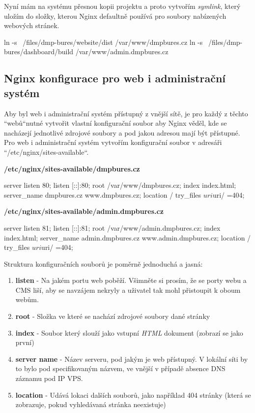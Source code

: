 \documentclass[12pt,a4paper]{report}
\begin{document}
  Nyní mám na systému přesnou kopii projektu a proto vytvořím \emph{symlink}, který uložím do složky,
  kterou Nginx defaultně používá pro soubory nabízených webových stránek.

  \begin{bash}
    ln -s ~/files/dmp-bures/website/dist /var/www/dmpbures.cz
    ln -s ~/files/dmp-bures/dashboard/build /var/www/admin.dmpbures.cz
  \end{bash}

  \subsection{Nginx konfigurace pro web i administrační systém}
  Aby byl web i administrační systém přístupný z vnější sítě, je pro každý z těchto ``webů``\space nutné  vytvořit 
  vlastní konfigurační soubor aby Nginx věděl, kde se nacházejí jednotlivé zdrojové soubory a 
  pod jakou adresou mají být přístupné.
  Pro web i administrační systém vytvořím konfigurační soubor v adresáři ``/etc/nginx/sites-available``.
  
  \noindent\textbf{/etc/nginx/sites-available/dmpbures.cz}
  \begin{bash}
  server {
    listen 80;
    listen [::]:80;
    root /var/www/dmpbures.cz;
    index index.html;
    server_name dmpbures.cz www.dmpbures.cz;
    location / {
      try_files $uri $uri/ =404;
    }
  }
  \end{bash}

  \noindent\textbf{/etc/nginx/sites-available/admin.dmpbures.cz}
  \begin{bash}
  server {
    listen 81;
    listen [::]:81;
    root /var/www/admin.dmpbures.cz;
    index index.html;
    server_name admin.dmpbures.cz www.admin.dmpbures.cz;
    location / {
      try_files $uri $uri/ =404;
    }
  }
  \end{bash}
  
  Struktura konfiguračních souborů je poměrně jednoduchá a jasná: 
  \begin{enumerate}
    \item \textbf{listen} - Na jakém portu web poběží. Všimněte si prosím, že se porty webu a CMS liší, aby se navzájem nekryly a uživatel tak mohl přistoupit k oboum webům.
    \item \textbf{root} - Složka ve které se nachází zdrojové soubory dané stránky
    \item \textbf{index} - Soubor který slouží jako vstupní \emph{HTML} dokument (zobrazí se jako první)
    \item \textbf{server name} - Název serveru, pod jakým je web přístupný. V lokální síti by to bylo pod specifikovaným názvem, ve vnější v případě absence DNS záznamu pod IP VPS.
    \item \textbf{location} - Udává lokaci dalších souborů, jako například 404 stránky (která se zobrazuje, pokud vyhledávaná stránka neexistuje)
  \end{enumerate}
\end{document}
